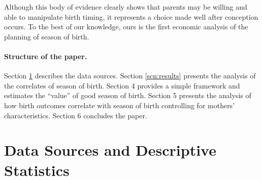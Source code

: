 \documentclass[a4paper, 11.5 pt]{article}
\theoremstyle{plain}
\begin{document}
\begin{doublespace}
Although this body of evidence clearly shows that parents may be willing and able to manipulate birth timing, it represents a choice made well after conception occurs. To the best of our knowledge, ours is the first economic analysis of the planning of season of birth.

\paragraph{Structure of the paper.} Section \ref{scn:data} describes the data sources. Section \ref{scn:results} presents the analysis of the correlates of season of birth. Section 4 provides a simple framework and estimates the ``value'' of good season of birth. Section 5 presents the analysis of how birth outcomes correlate with season of birth controlling for mothers' characteristics. Section 6 concludes the paper.

\newpage
\section{Data Sources and Descriptive Statistics}
\label{scn:data}

\end{doublespace}
\end{document}
